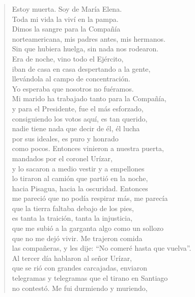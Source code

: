 \documentclass[12pt]{article}
\begin{document}
\clearpage
{}
\begin{verse}

Estoy muerta. Soy de María Elena.\\
Toda mi vida la viví en la pampa.\\
Dimos la sangre para la Compañía\\
norteamericana, mis padres antes, mis hermanos.\\
Sin que hubiera huelga, sin nada nos rodearon.\\
Era de noche, vino todo el Ejército,\\
iban de casa en casa despertando a la gente,\\
llevándola al campo de concentración.\\
Yo esperaba que nosotros no fuéramos.\\
Mi marido ha trabajado tanto para la Compañía,\\
y para el Presidente, fue el más esforzado,\\
consiguiendo los votos aquí, es tan querido,\\
nadie tiene nada que decir de él, él lucha\\
por sus ideales, es puro y honrado\\
como pocos. Entonces vinieron a nuestra puerta,\\
mandados por el coronel Urízar,\\
y lo sacaron a medio vestir y a empellones\\
lo tiraron al camión que partió en la noche,\\
hacia Pisagua, hacia la oscuridad. Entonces\\
me pareció que no podía respirar más, me parecía\\
que la tierra faltaba debajo de los pies,\\
es tanta la traición, tanta la injusticia,\\
que me subió a la garganta algo como un sollozo\\
que no me dejó vivir. Me trajeron comida\\
las compañeras, y les dije: ``No comeré hasta que vuelva''.\\
Al tercer día hablaron al señor Urízar,\\
que se rió con grandes carcajadas, enviaron\\
telegramas y telegramas que el tirano en Santiago\\
no contestó. Me fui durmiendo y muriendo,\\

\end{verse}
\end{document}
